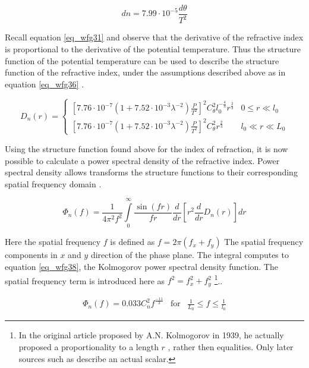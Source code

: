 \documentclass{article}
\begin{document}
\begin{equation}
dn = 7.99 \cdot 10^{-5} \frac{d\theta}{T^2}
\label{eq_wfg35}
\end{equation}

Recall equation \ref{eq_wfg31} and observe that the derivative of the  refractive index is proportional to the derivative of the potential temperature. Thus the structure function of the potential temperature can be used to describe the structure function of the refractive index, under the assumptions described above as in equation \ref{eq_wfg36} \cite{zernikeMatlab}.

\begin{equation}
D_n(r) = 
\begin{cases}
\left[7.76 \cdot 10^{-7} \left(1 + 7.52 \cdot 10^{-3} \lambda^{-2} \right) \frac{P}{T^2} \right]^2 C_\theta^2 l_0^{-\frac{4}{3}} r^{\frac{2}{3}} & 0 \leq r \ll l_0\\
\left[7.76 \cdot 10^{-7} \left(1 + 7.52 \cdot 10^{-3} \lambda^{-2} \right) \frac{P}{T^2} \right]^2 C_\theta^2 r^{\frac{2}{3}} & l_0 \ll r \ll L_0 
\end{cases}
\label{eq_wfg36}
\end{equation}

Using the structure function found above for the index of refraction, it is now possible to calculate a power spectral density of the refractive index. Power spectral density allows transforms the structure functions to their corresponding spatial frequency domain \cite{zernikeMatlab}.

\begin{equation}
\Phi_n(f) = \frac{1}{4 \pi^2 f^2} \int \limits_0^\infty \frac{\sin(f r)}{f r} \frac{d}{dr} \left[ r^2 \frac{d}{dr} D_n(r) \right] dr
\label{eq_wfg37}
\end{equation}

Here the spatial frequency $f$ is defined as $f = 2 \pi (f_x + f_y)$ The spatial frequency components in $x$ and $y$ direction of the phase plane. The integral computes to equation \ref{eq_wfg38}, the Kolmogorov power spectral density function. The spatial frequency term is introduced here as $f^2 =f_x^2 + f_y^2$ \cite{zernikeMatlab} \cite{lectureNotes} \footnote{In the original article proposed by A.N. Kolmogorov in 1939, he actually proposed a proportionality to a length $r$ \cite{kolmogorov1941local}, rather then equalities. Only later sources such as \cite{zernikeMatlab} describe an actual scalar.}.. 

\begin{equation}
\begin{matrix}
\Phi_n(f) = 0.033 C_n^2 f^{\frac{-11}{3}} & \text{for} & \frac{1}{L_0} \leq f \leq \frac{1}{l_0}
\end{matrix}
\label{eq_wfg38}
\end{equation}
\end{document}
